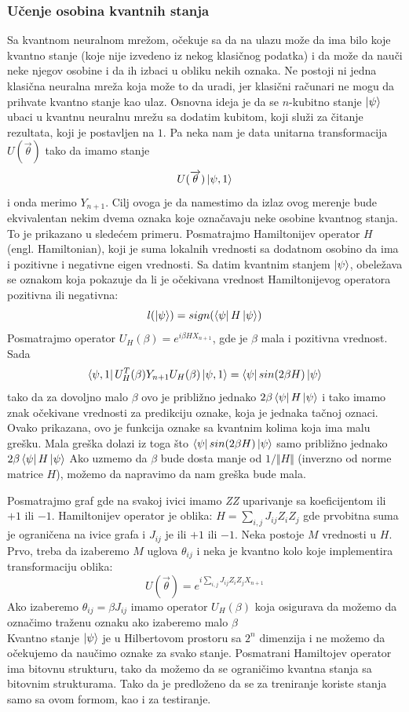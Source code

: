 \documentclass[12pt, letterpaper, oneside]{article}
\begin{document}
\subsubsection{Učenje osobina kvantnih stanja}
Sa kvantnom neuralnom mrežom, očekuje sa da na ulazu može da ima bilo koje kvantno stanje (koje nije izvedeno iz nekog klasičnog podatka)
i da može da nauči neke njegov osobine i da ih izbaci u obliku nekih oznaka. Ne postoji ni jedna klasična neuralna mreža koja može to da uradi, jer klasični računari ne mogu da prihvate kvantno stanje kao ulaz.
Osnovna ideja je da se $n$-kubitno stanje $\Ket{\psi}$ ubaci u kvantnu neuralnu mrežu sa dodatim kubitom, koji služi za čitanje rezultata, koji je postavljen na $1$.
Pa neka nam je data unitarna transformacija $U(\overrightarrow{\theta})$ tako da imamo stanje
\[
    U(\overrightarrow{\theta})\Ket{\psi,1}
\] 
i onda merimo $Y_{n+1}$. Cilj ovoga je da namestimo da izlaz ovog merenje bude ekvivalentan nekim dvema oznaka koje označavaju neke osobine kvantnog stanja.
To je prikazano u sledećem primeru.
Posmatrajmo Hamiltonijev operator $H$ (engl. Hamiltonian), koji je suma lokalnih vrednosti sa dodatnom osobino da ima i pozitivne i negativne eigen vrednosti.
Sa datim kvantnim stanjem $\ket{\psi}$, obeležava se oznakom koja pokazuje da li je očekivana vrednost Hamiltonijevog operatora pozitivna ili negativna:
\[
    l(\Ket{\psi}) = sign(\bra{\psi}H\Ket{\psi})
\]
Posmatrajmo operator $U_H(\beta) = e^{i\beta HX_{n+1}}$, gde je $\beta$ mala i pozitivna vrednost. Sada
\[
    \Bra{\psi,1}U_H^T(\beta)Y_{n+1}U_H(\beta)\Ket{\psi,1} = \bra{\psi}sin(2\beta H)\Ket{\psi}
\]
tako da za dovoljno malo $\beta$ ovo je približno jednako $2\beta\bra{\psi}H\Ket{\psi}$ i tako imamo znak očekivane vrednosti za 
predikciju oznake, koja je jednaka tačnoj oznaci. Ovako prikazana, ovo je funkcija oznake sa kvantnim kolima koja ima malu grešku.
Mala greška dolazi iz toga što $\bra{\psi}sin(2\beta H)\Ket{\psi}$ samo približno jednako $2\beta\bra{\psi}H\Ket{\psi}$
Ako uzmemo da $\beta$ bude dosta manje od $1/\Vert H \Vert$ (inverzno od norme matrice $H$), možemo da napravimo da nam greška bude mala.

Posmatrajmo graf gde na svakoj ivici imamo \textit{ZZ} uparivanje sa koeficijentom ili $+1$ ili $-1$.
Hamiltonijev operator je oblika: $H = \sum_{i,j}J_{ij}Z_iZ_j$ gde prvobitna suma je ograničena na ivice grafa i $J_{ij}$ je ili $+1$ ili $-1$.
Neka postoje $M$ vrednosti u $H$. Prvo, treba da izaberemo $M$ uglova $\theta_{ij}$ i neka je kvantno kolo koje implementira transformaciju oblika:
\[
    U(\overrightarrow{\theta}) = e^{i\sum_{i,j}J_{ij}Z_iZ_jX_{n+1}}
\]
Ako izaberemo $\theta_{ij}=\beta J_{ij}$ imamo operator $U_H(\beta)$ koja osigurava da možemo da označimo traženu oznaku ako izaberemo malo $\beta$ \\
Kvantno stanje $\Ket{\psi}$ je u Hilbertovom prostoru sa $2^n$ dimenzija i ne možemo da očekujemo da naučimo oznake za svako stanje.
Posmatrani Hamiltojev operator ima bitovnu strukturu, tako da možemo da se ograničimo kvantna stanja sa bitovnim strukturama.
Tako da je predloženo da se za treniranje koriste stanja samo sa ovom formom, kao i za testiranje.
\newpage
\end{document}
